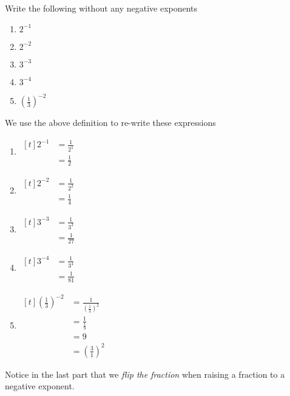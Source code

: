 \begin{myexample}\label{ex:negexponnumeric}
Write the following without any negative exponents
\begin{multicols}{5}
	\begin{enumerate}
		\item $2^{-1}$
		\item $2^{-2}$
		\item $3^{-3}$
		\item $3^{-4}$
		\item $\left(\frac{1}{3}\right)^{-2}$
	\end{enumerate} 
\end{multicols}
\end{myexample}
\begin{myProof}
	We use the above definition to re-write these expressions
	\begin{enumerate}
		\item 
		$\begin{aligned}[t]
			2^{-1} & =  \frac{1}{2^1} \\
			       & =  \frac{1}{2}   
		\end{aligned}$
		\item 
		$\begin{aligned}[t]
			2^{-2} & =  \frac{1}{2^2} \\
			       & =  \frac{1}{4}   
		\end{aligned}$
		\item 
		$\begin{aligned}[t]
			3^{-3} & =  \frac{1}{3^3} \\
			       & =  \frac{1}{27}  
		\end{aligned}$
		\item 
		$\begin{aligned}[t]
			3^{-4} & =  \frac{1}{3^4} \\
			       & =  \frac{1}{81}  
		\end{aligned}$ 
		\item 
		$\begin{aligned}[t]
			\left(\frac{1}{3}\right)^{-2} & =  \frac{1}{\left(\frac{1}{3}\right)^2} \\
			                              & =  \frac{1}{\frac{1}{9}}                \\
			                              & =  9                                    \\
			                              & =  \left(\frac{3}{1}\right)^2           
		\end{aligned}$ 
	\end{enumerate} 
	Notice in the last part that we {\em flip the fraction} when raising a fraction to a negative exponent.
\end{myProof}


